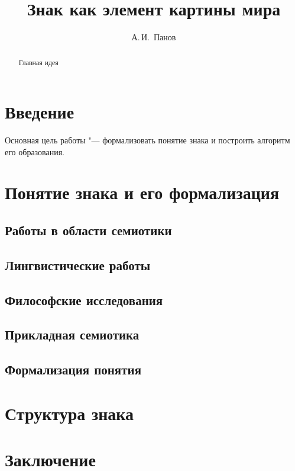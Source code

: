 \documentclass[a4paper,12pt]{article}
\begin{document}
	\title{Знак как элемент картины мира}
	\author{А.\,И.~Панов}
	
	\maketitle{}
	
	\begin{abstract}
		Главная идея
	\end{abstract}
	
	\section*{Введение}
	Основная цель работы "--- формализовать понятие знака и построить алгоритм его образования.
	
	\section{Понятие знака и его формализация}
	\subsection{Работы в области семиотики}
	
	\subsection{Лингвистические работы}
	
	\subsection{Философские исследования}
	
	\subsection{Прикладная семиотика}
	
	\subsection{Формализация понятия}
	
	\section{Структура знака}
	\section*{Заключение}
	
    
    
\end{document}
